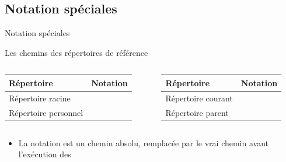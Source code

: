 \subsection{Notation spéciales}
\begin{frame}{Notation spéciales}
  \begin{block}{Les chemins des répertoires de référence}
    \begin{columns}
      \begin{column}{6cm}
        \begin{center}
          \begin{tabular}{lr}
            \hline
            Répertoire&Notation\\
            \hline
            Répertoire racine&\lin{/}\\
            Répertoire personnel&\lin{\~{}}\\
            \hline
          \end{tabular}
        \end{center}
      \end{column}
      \begin{column}{6cm}
        \begin{center}
          \begin{tabular}{lr}
            \hline
            Répertoire&Notation\\
            \hline
            Répertoire courant&\lin{.}\\
            Répertoire parent&\lin{..}\\
            \hline
          \end{tabular}
        \end{center}
      \end{column}
    \end{columns}
    \begin{itemize}
    \item[\ddialogwarning] La notation \lin{\~{}} est un chemin
      absolu, remplacée par le vrai chemin avant l'exécution des

\end{itemize}
\end{block}
\end{frame}
